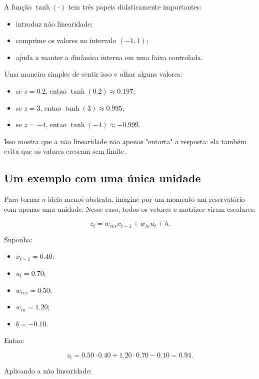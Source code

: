 \documentclass[12pt]{article}
\providecommand{\tightlist}{%
              \setlength{\itemsep}{0pt}\setlength{\parskip}{0pt}}
\begin{document}
A função \(\tanh(\cdot)\) tem três papeis didaticamente importantes:

\begin{itemize}
\tightlist
\item
  introduz não linearidade;
\item
  comprime os valores no intervalo \((-1,1)\);
\item
  ajuda a manter a dinâmica interna em uma faixa controlada.
\end{itemize}

Uma maneira simples de sentir isso e olhar alguns valores:

\begin{itemize}
\tightlist
\item
  se \(z = 0.2\), entao \(\tanh(0.2) \approx 0.197\);
\item
  se \(z = 3\), entao \(\tanh(3) \approx 0.995\);
\item
  se \(z = -4\), entao \(\tanh(-4) \approx -0.999\).
\end{itemize}

Isso mostra que a não linearidade não apenas "entorta" a resposta: ela também evita que os valores crescam sem limite.

\subsection{Um exemplo com uma única unidade}\label{35-um-exemplo-com-uma-uxfanica-unidade}

Para tornar a ideia menos abstrata, imagine por um momento um reservatório com apenas uma unidade. Nesse caso, todos os vetores e matrizes viram escalares:

\[
z_t = w_{res} x_{t-1} + w_{in} u_t + b.
\]

Suponha:

\begin{itemize}
\tightlist
\item
  \(x_{t-1} = 0.40\);
\item
  \(u_t = 0.70\);
\item
  \(w_{res} = 0.50\);
\item
  \(w_{in} = 1.20\);
\item
  \(b = -0.10\).
\end{itemize}

Entao:

\[
z_t = 0.50 \cdot 0.40 + 1.20 \cdot 0.70 - 0.10 = 0.94.
\]

Aplicando a não linearidade:
\end{document}
